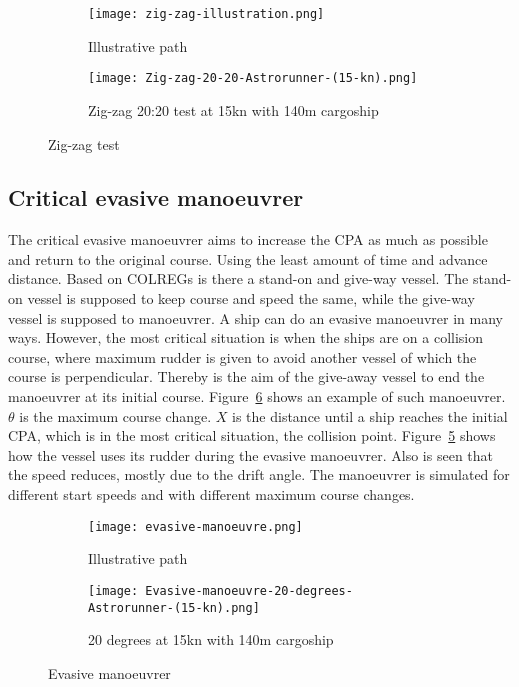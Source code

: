 \begin{figure}[p]
	\begin{subfigure}[b]{0.43\linewidth}
		\centering
		\texttt{[image: zig-zag-illustration.png]}
		\caption{Illustrative path}
		\label{fig:zig-zag-path}
	\end{subfigure} 
	\begin{subfigure}[b]{0.56\linewidth}
		\centering
		\texttt{[image: Zig-zag-20-20-Astrorunner-(15-kn).png]}
		\caption{Zig-zag 20:20 test at 15kn with 140m cargoship}
		\label{fig:zig-zag-astrorunner}
	\end{subfigure}
	\caption{Zig-zag test}
	\label{fig:zig-zag} 
\end{figure}

\newpage

\subsection{Critical evasive manoeuvrer}
\label{sec:evasive-manoeuvrer}
The critical evasive manoeuvrer aims to increase the \acf{CPA} as much as possible and return to the original course. Using the least amount of time and advance distance. Based on \ac{COLREGs} is there a stand-on and give-way vessel. The stand-on vessel is supposed to keep course and speed the same, while the give-way vessel is supposed to manoeuvrer. 
A ship can do an evasive manoeuvrer in many ways. However, the most critical situation is when the ships are on a collision course, where maximum rudder is given to avoid another vessel of which the course is perpendicular. Thereby is the aim of the give-away vessel to end the manoeuvrer at its initial course. Figure~\ref{fig:evasive-manoeuvrer} shows an example of such manoeuvrer. $\theta$ is the maximum course change. $X$ is the distance until a ship reaches the initial CPA, which is in the most critical situation, the collision point. Figure~\ref{fig:astrorunner-evasive-20} shows how the vessel uses its rudder during the evasive manoeuvrer. Also is seen that the speed reduces, mostly due to the drift angle. The manoeuvrer is simulated for different start speeds and with different maximum course changes. 

\begin{figure}[hbp]
	\begin{subfigure}[b]{0.43\linewidth}
		\centering
		\texttt{[image: evasive-manoeuvre.png]}
		\caption{Illustrative path}
		\label{fig:evasive-manoeuvrer-path}
	\end{subfigure} 
	\begin{subfigure}[b]{0.56\linewidth}
		\centering
		\texttt{[image: Evasive-manoeuvre-20-degrees-Astrorunner-(15-kn).png]}
		\caption{20 degrees at 15kn with 140m cargoship}
		\label{fig:astrorunner-evasive-20}
	\end{subfigure}
	\caption{Evasive manoeuvrer}
	\label{fig:evasive-manoeuvrer} 
\end{figure}
\clearpage


